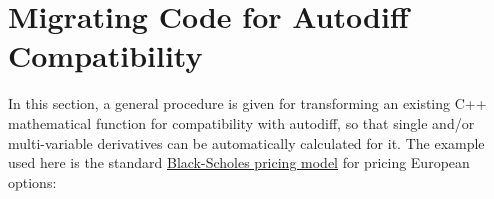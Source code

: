 \documentclass{article}
\begin{document}
%
%
%
%
%

%

\section{Migrating Code for Autodiff Compatibility}\label{migrate}

In this section, a general procedure is given for transforming an existing C++
mathematical function for compatibility with autodiff, so that single and/or multi-variable
derivatives can be automatically calculated for it. The example used here is the standard
\href{https://en.wikipedia.org/wiki/Greeks_(finance)#Formulas_for_European_option_Greeks}{Black-Scholes pricing
model} for pricing European options:
\end{document}

